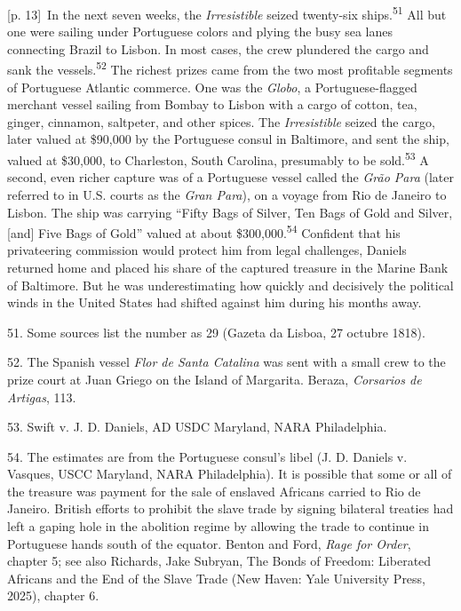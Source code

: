 \documentclass[10pt,a4paper]{article}
\begin{document}
{\scriptsize\color{gray} [p. 13]}\ In the next seven weeks, the \textit{Irresistible} seized twenty-six ships.\nobreak\textsuperscript{51} All but one were sailing under Portuguese colors and plying the busy sea lanes connecting Brazil to Lisbon. In most cases, the crew plundered the cargo and sank the vessels.\nobreak\textsuperscript{52} The richest prizes came from the two most profitable segments of Portuguese Atlantic commerce. One was the \textit{Globo}, a Portuguese-flagged merchant vessel sailing from Bombay to Lisbon with a cargo of cotton, tea, ginger, cinnamon, saltpeter, and other spices. The \textit{Irresistible} seized the cargo, later valued at \$90,000 by the Portuguese consul in Baltimore, and sent the ship, valued at \$30,000, to Charleston, South Carolina, presumably to be sold.\nobreak\textsuperscript{53} A second, even richer capture was of a Portuguese vessel called the \textit{Grão Para} (later referred to in U.S. courts as the \textit{Gran Para}), on a voyage from Rio de Janeiro to Lisbon. The ship was carrying “Fifty Bags of Silver, Ten Bags of Gold and Silver, [and] Five Bags of Gold” valued at about \$300,000.\nobreak\textsuperscript{54} Confident that his privateering commission would protect him from legal challenges, Daniels returned home and placed his share of the captured treasure in the Marine Bank of Baltimore. But he was underestimating how quickly and decisively the political winds in the United States had shifted against him during his months away.\par{\small 51. Some sources list the number as 29 (Gazeta da Lisboa, 27 octubre 1818).\par}{\small 52. The Spanish vessel \textit{Flor de Santa Catalina} was sent with a small crew to the prize court at Juan Griego on the Island of Margarita. Beraza, \textit{Corsarios de Artigas}, 113.\par}{\small 53. Swift v. J. D. Daniels, AD USDC Maryland, NARA Philadelphia.\par}{\small 54. The estimates are from the Portuguese consul’s libel (J. D. Daniels v. Vasques, USCC Maryland, NARA Philadelphia). It is possible that some or all of the treasure was payment for the sale of enslaved Africans carried to Rio de Janeiro. British efforts to prohibit the slave trade by signing bilateral treaties had left a gaping hole in the abolition regime by allowing the trade to continue in Portuguese hands south of the equator. Benton and Ford, \textit{Rage for Order}, chapter 5; see also Richards, Jake Subryan, The Bonds of Freedom: Liberated Africans and the End of the Slave Trade (New Haven: Yale University Press, 2025), chapter 6.\par}
\end{document}
